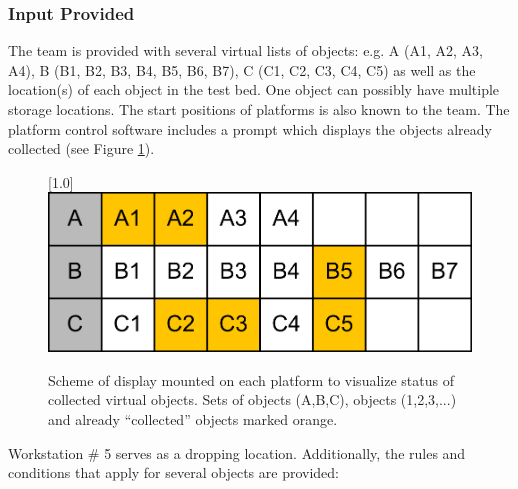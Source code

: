 \subsubsection{Input Provided}
\label{sssec:PlanningSchedulingInput}

The team is provided with several virtual lists of objects: e.g. A (A1, A2, A3, A4), B (B1, B2, B3, B4, B5, B6, B7), C (C1, C2, C3, C4, C5) as well as the location(s) of each object in the test bed.
One object can possibly have multiple storage locations.
The start positions of platforms is also known to the team.
The platform control software includes a prompt which displays the objects already collected (see Figure \ref{fig:PlanningandSchedulingDisplay}).
%
\begin{figure}[!htbp]
  \begin{center}
    \scalebox{1.0}[1.0]{
      \includegraphics[width=\linewidth,angle=0]{pics/workObjects/PlanningDisplay}
    }
    \caption{Scheme of display mounted on each platform to visualize status of collected virtual objects. Sets of objects (A,B,C), objects (1,2,3,...) and already ``collected'' objects marked orange.}
    \label{fig:PlanningandSchedulingDisplay}
  \end{center}
\end{figure}
%
Workstation \# 5 serves as a dropping location.
Additionally, the rules and conditions that apply for several objects are provided:
%
